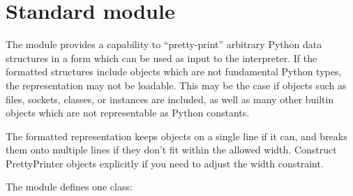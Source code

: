 
\section{Standard module }

The  module provides a capability to ``pretty-print''
arbitrary Python data structures in a form which can be used as input
to the interpreter.  If the formatted structures include objects which
are not fundamental Python types, the representation may not be
loadable.  This may be the case if objects such as files, sockets,
classes, or instances are included, as well as many other builtin
objects which are not representable as Python constants.

The formatted representation keeps objects on a single line if it can,
and breaks them onto multiple lines if they don't fit within the
allowed width.  Construct PrettyPrinter objects explicitly if you need
to adjust the width constraint.

The  module defines one class:

\renewcommand{\indexsubitem}{(in module pprint)}


